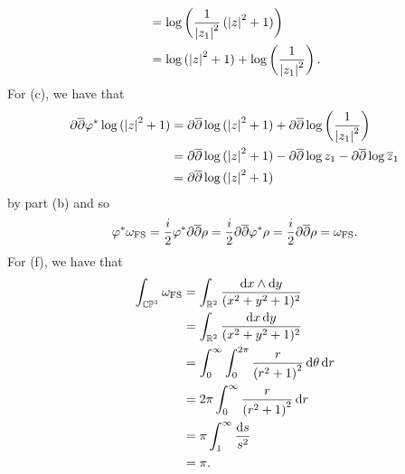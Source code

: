 \begin{solution}
\begin{align*}
&= \log\del[3]{\frac{1}{\abs[0]{z_1}^2}\del[0]{\abs[0]{z}^2 + 1}}\\
&= \log\del[0]{\abs[0]{z}^2 + 1} + \log\del[3]{\frac{1}{\abs[0]{z_1}^2}}.
\end{align*}
For (c), we have that 
\begin{align*}
\partial\overline{\partial}\varphi^*\log\del[0]{\abs[0]{z}^2 + 1} &= \partial\overline{\partial}\log\del[0]{\abs[0]{z}^2 + 1} + \partial\overline{\partial}\log\del[3]{\frac{1}{\abs[0]{z_1}^2}}\\
&= \partial\overline{\partial}\log\del[0]{\abs[0]{z}^2 + 1} - \partial\overline{\partial}\log z_1 - \partial\overline{\partial}\log \overline{z}_1\\
&= \partial\overline{\partial}\log\del[0]{\abs[0]{z}^2 + 1}
\end{align*}
\noindent by part (b) and so
\begin{equation*}
\varphi^*\omega_{\mathrm{FS}} = \frac{i}{2}\varphi^*\partial\overline{\partial}\rho = \frac{i}{2}\partial\overline{\partial}\varphi^*\rho = \frac{i}{2}\partial\overline{\partial}\rho = \omega_{\mathrm{FS}}.
\end{equation*}
For (f), we have that
\begin{align*}
\int_{\CPbb^1} \omega_{\FSrm} &= \int_{\Rbb^2}\frac{\d x \wedge \d y}{(x^2 + y^2 + 1)^2}\\
&= \int_{\Rbb^2}\frac{\d x\d y}{(x^2 + y^2 + 1)^2}\\
&= \int_0^\infty\int_0^{2\pi}\frac{r}{\del[0]{r^2 + 1}^2}\d\theta\d r\\
&= 2\pi \int_0^\infty\frac{r}{\del[0]{r^2 + 1}^2}\d r\\
&= \pi \int_1^\infty \frac{\d s}{s^2}\\
&= \pi.
\end{align*}
\end{solution}